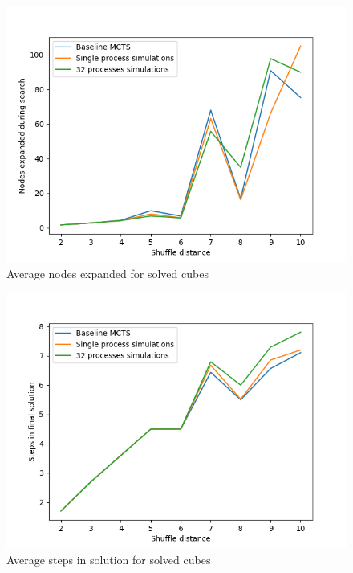 \documentclass[10pt,twocolumn,letterpaper]{article}
\begin{document}
\begin{figure}
  \includegraphics[width=\linewidth]{para_nodes.png}
  \caption{Average nodes expanded for solved cubes}
  \label{fig:net}
\end{figure}

\begin{figure}
  \includegraphics[width=\linewidth]{para_steps.png}
  \caption{Average steps in solution for solved cubes}
  \label{fig:net}
\end{figure}



\end{document}
